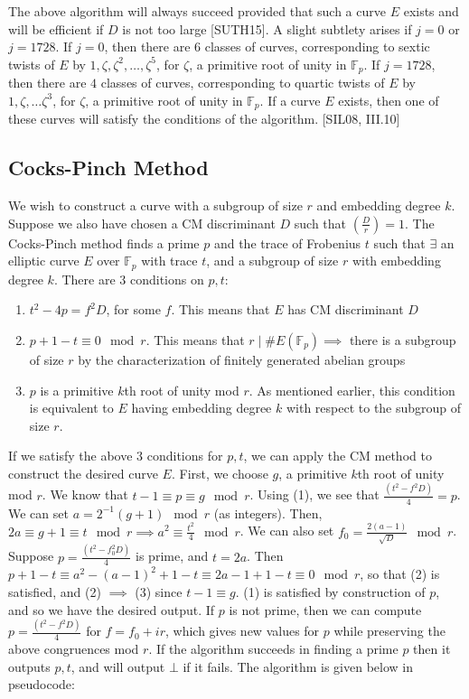 \documentclass[12pt,twoside]{article}
\newcommand{\legendre}[2]{\genfrac{(}{)}{}{}{#1}{#2}}
\begin{document}
 
 
 
 
 
 
\noindent The above algorithm will always succeed provided that such a curve $E$ exists and will be efficient if $D$ is not too large [SUTH15]. A slight subtlety arises if $j = 0$ or $j = 1728$. If $j = 0$, then there are $6$ classes of curves, corresponding to sextic twists of $E$ by $1, \zeta, \zeta^2, \dots, \zeta^5$, for $\zeta$, a primitive root of unity in $\mathbb F_p$. If $j = 1728$, then there are $4$ classes of curves, corresponding to quartic twists of $E$ by $1, \zeta, \dots \zeta^3$, for $\zeta$, a primitive root of unity in $\mathbb F_p$. If a curve $E$ exists, then one of these curves will satisfy the conditions of the algorithm. [SIL08, III.10]

\subsection{Cocks-Pinch Method}

We wish to construct a curve with a subgroup of size $r$ and embedding degree $k$. Suppose we also have chosen a CM discriminant $D$ such that $\legendre{D}{r} = 1$. The Cocks-Pinch method finds a prime $p$ and the trace of Frobenius $t$ such that $\exists$ an elliptic curve $E$ over $\mathbb F_p$ with trace $t$, and a subgroup of size $r$ with embedding degree $k$. There are $3$ conditions on $p,t$:
\begin{enumerate}
\item $t^2-4p = f^2 D$, for some $f$. This means that $E$ has CM discriminant $D$
\item $p+1-t \equiv 0 \mod r$. This means that $r \mid \#E(\mathbb F_p) \implies $ there is a subgroup of size $r$ by the characterization of finitely generated abelian groups
\item $p$ is a primitive $k$th root of unity mod $r$. As mentioned earlier, this condition is equivalent to $E$ having embedding degree $k$ with respect to the subgroup of size $r$.

\end{enumerate}
If we satisfy the above $3$ conditions for $p,t$, we can apply the CM method to construct the desired curve $E$. First, we choose $g$, a primitive $k$th root of unity mod $r$. We know that $t-1 \equiv p \equiv g \mod r$. Using (1), we see that $\frac{(t^2 - f^2 D)}{4} = p$. We can set $a= 2^{-1} (g+1) \mod r$ (as integers). Then, $2 a \equiv g+1 \equiv t \mod r \implies a^2 \equiv \frac{t^2}{4} \mod r$. We can also set $f_0 = \frac{2(a-1)}{\sqrt D} \mod r$. Suppose $p = \frac{(t^2 - f^2_0 D)}{4}$ is prime, and $t = 2a$. Then $p+1 - t \equiv a^2 - (a-1)^2 + 1 - t \equiv 2a -1 + 1 - t \equiv 0 \mod r$, so that (2) is satisfied, and (2) $\implies$ (3) since $t-1 \equiv g$. (1) is satisfied by construction of $p$, and so we have the desired output. If $p$ is not prime, then we can compute $p = \frac{(t^2 - f^2 D)}{4}$ for $f = f_0 + ir$, which gives new values for $p$ while preserving the above congruences mod $r$. If the algorithm succeeds in finding a prime $p$ then it outputs $p,t$, and will output $\bot$ if it fails. The algorithm is given below in pseudocode:
 
\end{document}
